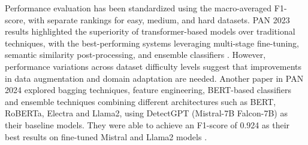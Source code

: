 Performance evaluation has been standardized using the macro-averaged F1-score, with separate rankings for easy, medium, and hard datasets. PAN 2023 results highlighted the superiority of transformer-based models over traditional techniques, with the best-performing systems leveraging multi-stage fine-tuning, semantic similarity post-processing, and ensemble classifiers \cite{paper2}. However, performance variations across dataset difficulty levels suggest that improvements in data augmentation and domain adaptation are needed. Another paper in PAN 2024 explored bagging techniques, feature engineering, BERT-based classifiers and ensemble techniques combining different architectures such as BERT, RoBERTa, Electra and Llama2, using DetectGPT (Mistral-7B Falcon-7B) as their baseline models. They were able to achieve an F1-score of 0.924 as their best results on fine-tuned Mistral and Llama2 models \cite{paper1}.


